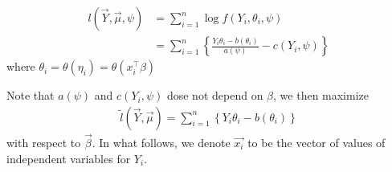 \begin{align*}
l(\vec{Y}, \vec{\mu}, \psi) & =\sum_{i=1}^{n} \log f(Y_i, \theta_{i}, \psi) \\
& =\sum_{i=1}^{n}\left\{ \frac{Y_i \theta_{i} - b\left(\theta_{i}\right)}{a\left(\psi\right)} - c(Y_i, \psi)\right\}
\end{align*}
where $\theta_{i} = \theta(\eta_{i}) = \theta(x_i^\top \beta)$

Note that $a(\psi)$ and $c(Y_i, \psi)$ dose not depend on $\beta$, we then maximize
\begin{align}
\label{likelihood}
\tilde{l}(\vec{Y}, \vec{\mu}) = \sum_{i = 1}^{n} \left\{ Y_i \theta_{i} - b(\theta_{i}) \right\}
\end{align}
with respect to $\vec{\beta}$.
In what follows, we denote $\vec{x_i}$ to be the vector of values of independent variables for $Y_i$.
